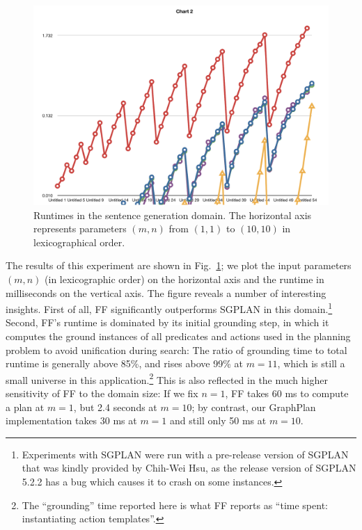 \begin{figure}
  \centering
  \includegraphics[width=1\columnwidth]{pic-runtime-modifiers-with-sgplan}
  \caption{Runtimes in the sentence generation domain.  The horizontal
  axis represents parameters $(m,n)$ from $(1,1)$ to $(10,10)$ in
  lexicographical order.}
  \label{fig:runtimes-crisp}
\end{figure}

The results of this experiment are shown in
Fig.~\ref{fig:runtimes-crisp}; we plot the input parameters $(m,n)$
(in lexicographic order) on the horizontal axis and the runtime in
milliseconds on the vertical axis.  The figure reveals a number of
interesting insights.  First of all, FF significantly outperforms
SGPLAN in this domain.\footnote{Experiments with SGPLAN were run with
  a pre-release version of SGPLAN that was kindly provided by Chih-Wei
  Hsu, as the release version of SGPLAN 5.2.2 has a bug which causes
  it to crash on some instances.}  Second, FF's runtime is dominated
by its initial grounding step, in which it computes the ground
instances of all predicates and actions used in the planning problem
to avoid unification during search: The ratio of grounding time to
total runtime is generally above 85\%, and rises above 99\% at $m=11$,
which is still a small universe in this application.\footnote{The
  ``grounding'' time reported here is what FF reports as ``time spent:
  instantiating action templates''.}  This is also reflected in the
much higher sensitivity of FF to the domain size: If we fix $n=1$, FF
takes 60 ms to compute a plan at $m=1$, but 2.4 seconds at $m=10$; by
contrast, our GraphPlan implementation takes 30 ms at $m=1$ and still
only 50 ms at $m=10$.

